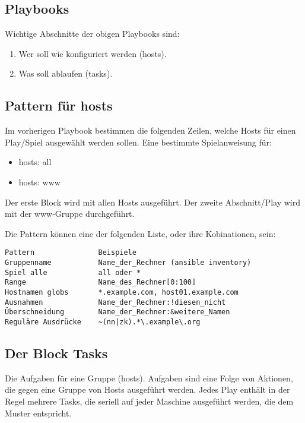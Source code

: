 \documentclass[11pt]{article}
\providecommand{\tightlist}{%
      \setlength{\itemsep}{0pt}\setlength{\parskip}{0pt}}
\begin{document}
    \subsection{Playbooks}\label{playbooks}

Wichtige Abschnitte der obigen Playbooks sind:

\begin{enumerate}
\def\labelenumi{\arabic{enumi}.}
\tightlist
\item
  Wer soll wie konfiguriert werden (hosts).
\item
  Was soll ablaufen (tasks).
\end{enumerate}

\subsection{Pattern für hosts}\label{pattern-fuxfcr-hosts}

Im vorherigen Playbook bestimmen die folgenden Zeilen, welche Hosts für
einen Play/Spiel ausgewählt werden sollen. Eine bestimmte Spielanweisung
für:

\begin{itemize}
\tightlist
\item
  hosts: all
\item
  hosts: www
\end{itemize}

Der erste Block wird mit allen Hosts ausgeführt. Der zweite
Abschnitt/Play wird mit der www-Gruppe durchgeführt.

Die Pattern können eine der folgenden Liste, oder ihre Kobinationen,
sein:

\begin{verbatim}
Pattern               Beispiele
Gruppenname           Name_der_Rechner (ansible inventory)
Spiel alle            all oder *
Range                 Name_des_Rechner[0:100]
Hostnamen globs       *.example.com, host01.example.com
Ausnahmen             Name_der_Rechner:!diesen_nicht
Überschneidung        Name_der_Rechner:&weitere_Namen
Reguläre Ausdrücke    ~(nn|zk).*\.example\.org
\end{verbatim}

\subsection{Der Block Tasks}\label{der-block-tasks}

Die Aufgaben für eine Gruppe (hosts). Aufgaben sind eine Folge von
Aktionen, die gegen eine Gruppe von Hosts ausgeführt werden. Jedes Play
enthält in der Regel mehrere Tasks, die seriell auf jeder Maschine
ausgeführt werden, die dem Muster entspricht.
\end{document}
